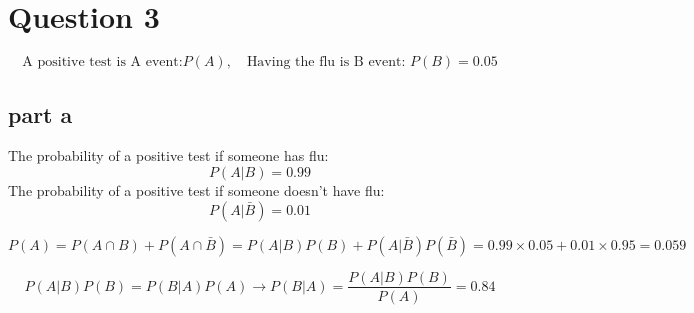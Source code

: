 \section{Question 3}
$$
\text{A positive test is A event:} P(A),\quad \text{Having the flu is B event: } P(B) = 0.05
$$
\subsection{part a}
The probability of a positive test if someone has flu:
$$
P(A \vert B) = 0.99
$$
The probability of a positive test if someone doesn't have flu:
$$
P(A \vert \bar B) = 0.01
$$

$$
P(A) = P(A \cap B) + P(A \cap \bar B) = P(A \vert B)P(B) + P(A \vert \bar B)P(\bar B) = 0.99 \times 0.05 + 0.01 \times 0.95 = 0.059
$$

$$
P(A\vert B)P(B) = P(B\vert A)P(A) \rightarrow P(B\vert A) = \dfrac{P(A\vert B)P(B)}{P(A)} = 0.84
$$